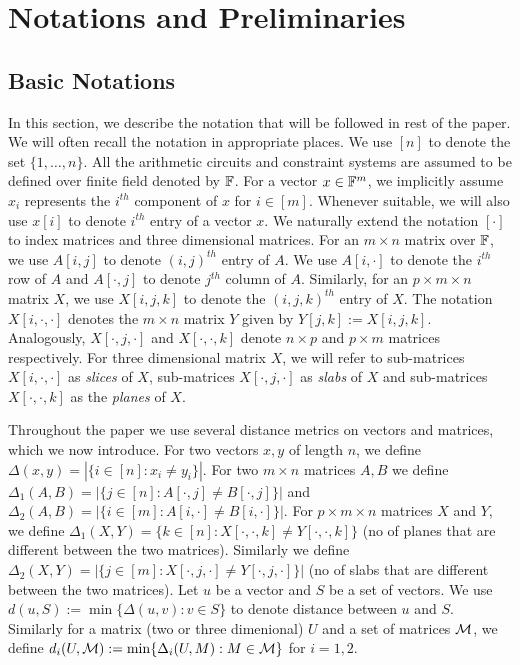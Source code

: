 \section{Notations and Preliminaries}\label{sec:prelims}
\subsection{Basic Notations}\label{sec:basicnotation}
In this section, we describe the notation that will be followed in rest of the
paper. We will often recall the notation in appropriate places. 
We use $[n]$ to
denote the set $\{1,\ldots,n\}$. All the arithmetic circuits and constraint
systems are assumed to be defined over finite field denoted by $\mathbb{F}$. For a
vector $x\in \mathbb{F}^m$, we implicitly assume $x_i$ represents the $i^{th}$
component of $x$ for $i\in [m]$. Whenever suitable, we will also use $x[i]$ to
denote $i^{th}$ entry of a vector $x$. We naturally extend the notation $[\cdot]$ to
index matrices and three dimensional matrices. For an $m\times n$ matrix over
$\mathbb{F}$, we use $A[i,j]$ to denote $(i,j)^{th}$ entry of $A$. We use $A[i,\cdot]$
to denote the $i^{th}$ row of $A$ and $A[\cdot,j]$ to denote $j^{th}$ column of
$A$. Similarly, for an $p\times m\times n$  matrix $X$, we use $X[i,j,k]$ to
denote the $(i,j,k)^{th}$ entry of $X$. The notation $X[i,\cdot,\cdot]$ denotes
the $m\times n$ matrix $Y$ given by $Y[j,k] := X[i,j,k]$. 
Analogously,
$X[\cdot,j,\cdot]$ and $X[\cdot,\cdot,k]$ denote $n\times p$ and $p\times m$
matrices respectively. For three dimensional
matrix $X$, we will refer to sub-matrices $X[i,\cdot,\cdot]$ as {\em slices} of
$X$, sub-matrices $X[\cdot,j,\cdot]$ as {\em slabs}  of $X$ and sub-matrices $X[\cdot,\cdot,k]$ as the {\em planes} of $X$. 

Throughout the paper we use several distance metrics on vectors and matrices,
which we now introduce. For two vectors $x,y$ of length $n$, we define
$\Delta(x,y)=|\{i\in [n]: x_i\neq y_i\}|$. For two $m\times n$ matrices $A,B$ we
define $\Delta_1(A,B)=|\{j\in [n]: A[\cdot,j]\neq B[\cdot,j]\}|$ and
$\Delta_2(A,B)=|\{i\in [m]: A[i,\cdot]\neq B[i,\cdot]\}|$. For $p\times m\times
n$ matrices $X$ and $Y$, we define $\Delta_1(X,Y)=\{k\in
[n]:X[\cdot,\cdot,k]\neq Y[\cdot,\cdot,k]\}$ (no of planes that are different between the two matrices). Similarly we define $\Delta_2(X,Y)
= |\{j\in [m]: X[\cdot,j,\cdot]\neq Y[\cdot,j,\cdot]\}|$  (no of slabs that are different between the two matrices). Let $u$ be a vector
and $S$ be a set of vectors. We use $d(u,S) := \min\{\Delta(u,v):v\in S\}$ to
denote distance between $u$ and $S$. Similarly for a matrix (two or three
dimenional) $U$ and a set of matrices $\mathcal{M}$, we define $d_i(U,\mathcal{M}) :=
\min\{\Delta_i(U,M): M\in \mathcal{M}\}$ for $i=1,2$.

